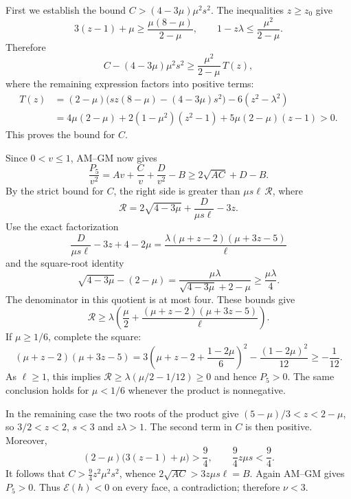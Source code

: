 First we establish the bound $C>(4-3\mu)\mu^2s^2$. The inequalities $z\ge z_0$ give
\[
 3(z-1)+\mu\ge\frac{\mu(8-\mu)}{2-\mu},\qquad
 1-z\lambda\le\frac{\mu^2}{2-\mu}.
\]
Therefore
\[
 C-(4-3\mu)\mu^2s^2\ge\frac{\mu^2}{2-\mu}\,T(z),
\]
where the remaining expression factors into positive terms:
\begin{align*}
 T(z)&=(2-\mu)\bigl(sz(8-\mu)-(4-3\mu)s^2\bigr)-6(z^2-\lambda^2)\\
 &=4\mu(2-\mu)+2(1-\mu^2)(z^2-1)+5\mu(2-\mu)(z-1)>0.
\end{align*}
This proves the bound for $C$.

Since $0<v\le1$, AM--GM now gives
\[
 \frac{P_5}{v^2}=Av+\frac Cv+\frac D{v^2}-B
 \ge2\sqrt{AC}+D-B.
\]
By the strict bound for $C$, the right side is greater than $\mu s\ell\,\mathcal R$, where
\[
 \mathcal R=2\sqrt{4-3\mu}+\frac D{\mu s\ell}-3z.
\]
Use the exact factorization
\[
 \frac D{\mu s\ell}-3z+4-2\mu
 =\frac{\lambda(\mu+z-2)(\mu+3z-5)}{\ell}
\]
and the square-root identity
\[
 \sqrt{4-3\mu}-(2-\mu)
 =\frac{\mu\lambda}{\sqrt{4-3\mu}+2-\mu}\ge\frac{\mu\lambda}{4}.
\]
The denominator in this quotient is at most four. These bounds give
\[
 \mathcal R\ge\lambda\left(\frac\mu2+
       \frac{(\mu+z-2)(\mu+3z-5)}{\ell}\right).
\]
If $\mu\ge1/6$, complete the square:
\[
 (\mu+z-2)(\mu+3z-5)
 =3\left(\mu+z-2+\frac{1-2\mu}{6}\right)^2-\frac{(1-2\mu)^2}{12}
 \ge-\frac1{12}.
\]
As $\ell\ge1$, this implies $\mathcal R\ge\lambda(\mu/2-1/12)\ge0$ and hence $P_5>0$.
The same conclusion holds for $\mu<1/6$ whenever the product is nonnegative.

In the remaining case the two roots of the product give
$(5-\mu)/3<z<2-\mu$, so $3/2<z<2$, $s<3$ and $z\lambda>1$.
The second term in $C$ is then positive. Moreover,
\[
 (2-\mu)\bigl(3(z-1)+\mu\bigr)>\frac94,
 \qquad \frac94z\mu s<\frac94.
\]
It follows that $C>\frac94z^2\mu^2s^2$, whence $2\sqrt{AC}>3z\mu s\ell=B$.
Again AM--GM gives $P_5>0$.
Thus $\mathcal E(h)<0$ on every face, a contradiction; therefore $\nu<3$.
